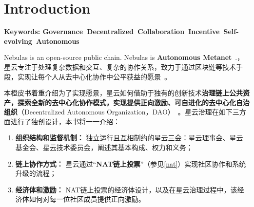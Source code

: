 
\section{Introduction}

\textbf{Keywords: Governance\ Decentralized\ Collaboration\ Incentive\ Self-evolving\ Autonomous }

\vspace{2em}

Nebulas is an open-source public chain. Nebulas is \textbf{Autonomous Metanet}~\cite{AutonomousMetanet}.，星云专注于处理复杂数据和交互、复杂的协作关系，致力于通过区块链等技术手段，实现让每个人从去中心化协作中公平获益的愿景~\cite{vision}。

本橙皮书着重介绍为了实现愿景，星云如何借助于独有的创新技术\textbf{治理链上公共资产，探索全新的去中心化协作模式，实现提供正向激励、可自进化的去中心化自治组织}（Decentralized Autonomous Organization，DAO）~\cite{DAO}。星云治理在如下三方面进行了独创设计，本书将一一介绍：

\begin{enumerate}
	\item \textbf{组织结构和监督机制：}
	独立运行且互相制约的星云三会：星云理事会、星云基金会、星云技术委员会，阐述其基本构成、权力和义务；
	\item \textbf{链上协作方式：}
	星云通过“\textbf{NAT链上投票}”（参见\ref{nat}）实现社区协作和系统升级的流程；
	\item \textbf{经济体和激励：}
	NAT链上投票的经济体设计，以及在星云治理过程中，该经济体如何对每一位社区成员提供正向激励。
\end{enumerate}
